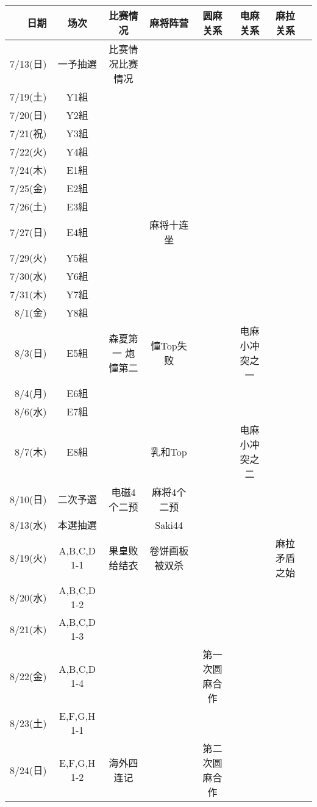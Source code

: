 {\renewcommand{}\selectfont
{}
\begin{longtable}{rccccccc}
\hline
	\bf 日期 & \bf 场次 & \bf 比赛情况 & \bf 麻将阵营 & \bf 圆麻关系 & \bf 电麻关系 & \bf 麻拉关系 \\ \hline
	7/13(日) & 一予抽選 & {\color{white}比赛情况比赛情况} &  &  &  &  \\ \hline
	7/19(土) & Y1組 &  &  &  &  &  \\ \hline
	7/20(日) & Y2組 &  &  &  &  &  \\ \hline
	7/21(祝) & Y3組 &  &  &  &  &  \\ \hline
	7/22(火) & Y4組 &  &  &  &  &  \\ \hline
	7/24(木) & E1組 &  &  &  &  &  \\ \hline
	7/25(金) & E2組 &  &  &  &  &  \\ \hline
	7/26(土) & E3組 &  &  &  &  &  \\ \hline
	7/27(日) & E4組 &  & 麻将十连坐 &  &  &  \\ \hline
	7/29(火) & Y5組 &  &  &  &  &  \\ \hline
	7/30(水) & Y6組 &  &  &  &  &  \\ \hline
	7/31(木) & Y7組 &  &  &  &  &  \\ \hline
	8/1(金) & Y8組 &  &  &  &  &  \\ \hline
	8/3(日) & E5組 & 森夏第一 炮憧第二 & 憧Top失败 &  & 电麻小冲突之一 &  \\ \hline
	8/4(月) & E6組 &  &  &  &  &  \\ \hline
	8/6(水) & E7組 &  &  &  &  &  \\ \hline
	8/7(木) & E8組 &  & 乳和Top &  & 电麻小冲突之二 &  \\ \hline
	8/10(日) & 二次予選 & 电磁4个二预 & 麻将4个二预 &  &  &  \\ \hline
	8/13(水) & 本選抽選 &  & Saki44 &  &  &  \\ \hline
	8/19(火) & A,B,C,D 1-1 & 果皇败给结衣 & 卷饼画板被双杀 &  &  & 麻拉矛盾之始 \\ \hline
	8/20(水) & A,B,C,D 1-2 &  &  &  &  &  \\ \hline
	8/21(木) & A,B,C,D 1-3 &  &  &  &  &  \\ \hline
	8/22(金) & A,B,C,D 1-4 &  &  & 第一次圆麻合作 &  &  \\ \hline
	8/23(土) & E,F,G,H 1-1 &  &  &  &  &  \\ \hline
	8/24(日) & E,F,G,H 1-2 & 海外四连记 &  & 第二次圆麻合作 &  &  \\ \hline

\end{longtable}}
